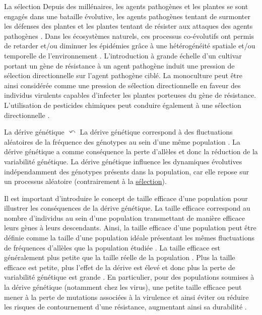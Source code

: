 \begin{encadre2}{La sélection}
	Depuis des  millénaires, les agents pathogènes et les plantes se sont engagés dans une bataille évolutive, les agents pathogènes tentant de surmonter les défenses des plantes et les plantes tentant de résister aux attaques des agents pathogènes \citep{Zhan2015}. 
Dans les écosystèmes naturels, ces processus co-évolutifs
ont permis de retarder et/ou diminuer les épidémies grâce à une hétérogénéité spatiale et/ou temporelle de l’environnement  \citep{Zhan2015, Burdon2014}. 
L’introduction à grande échelle d’un cultivar portant un gène de résistance à un agent pathogène   induit une pression de sélection directionnelle sur l'agent pathogène ciblé. 
La monoculture peut être ainsi considérée comme une pression de sélection directionnelle en faveur des individus virulents capables d’infecter les plantes porteuses du gène de résistance.%
L'utilisation de pesticides chimiques peut conduire également à une sélection directionnelle \citep{Pimentel1985}.
\end{encadre2}

\hypertarget{der1}{}
\begin{encadre2}{La dérive génétique}
  \hyperlink{der2}{$\curvearrowleft$}
La dérive génétique correspond à des fluctuations aléatoires de la fréquence des génotypes au sein d’une même population \citep{Henry1999}. 
La dérive génétique a comme conséquence la perte d’allèles et donc la  réduction de la variabilité génétique. La dérive génétique influence les dynamiques évolutives indépendamment des génotypes présents dans la population, car elle repose sur un processus aléatoire (contrairement à la \hyperlink{selec1}{sélection}).
\par
Il est important d’introduire le concept de taille efficace d’une population pour illustrer les conséquences de la dérive génétique. La taille efficace correspond au nombre d’individus au sein d’une population  transmettant de manière \og efficace \fg{} leurs gènes à leurs descendants.  Ainsi, la taille efficace d’une population peut être définie comme la taille d'une population \og idéale\fg{} présentant les mêmes fluctuations de fréquences d'allèles que la population étudiée  \citep{Gutierrez2012}.
La taille efficace est généralement plus petite que la taille réelle de la population \citep{Charlesworth2009}. 
 Plus la taille efficace est petite, plus l’effet de la dérive est élevé et donc plus la perte de  variabilité génétique est grande \citep{McDonald2002}. En particulier, pour des populations  soumises à la dérive génétique (notamment chez les virus), une petite taille efficace peut mener à la perte de mutations associées à la virulence et ainsi éviter ou réduire les risques  de contournement d'une résistance, augmentant ainsi sa durabilité \citep{Rousseau2019}.
\end{encadre2}

